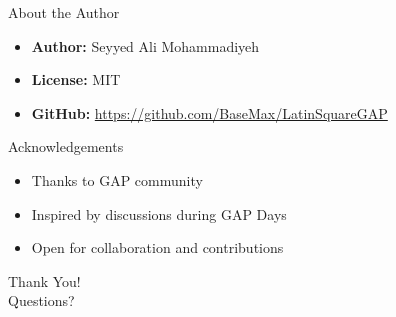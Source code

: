 \documentclass{beamer}
\begin{document}
	\begin{frame}{About the Author}
		\begin{itemize}
			\item \textbf{Author:} Seyyed Ali Mohammadiyeh
			\item \textbf{License:} MIT
			\item \textbf{GitHub:} \url{https://github.com/BaseMax/LatinSquareGAP}
		\end{itemize}
	\end{frame}
	
	\begin{frame}{Acknowledgements}
		\begin{itemize}
			\item Thanks to GAP community
			\item Inspired by discussions during GAP Days
			\item Open for collaboration and contributions
		\end{itemize}
	\end{frame}
	
	\begin{frame}
		\centering
		\Huge Thank You! \\
		\vspace{0.5cm}
		Questions?
	\end{frame}
	
\end{document}
